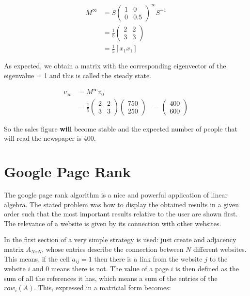 \documentclass{article}
\begin{document}
\begin{equation}
\begin{aligned}
M^\infty &= 
	S 
	\begin{pmatrix}
	1 & 0 \\ 
	0 & 0.5 
	\end{pmatrix}^\infty
	S^{-1} \\
    &= \frac{1}{5} 
	\begin{pmatrix}
	2 & 2 \\ 
	3 & 3
	\end{pmatrix} \\
	&= \frac{1}{5} [x_1 x_1]
\end{aligned}
\end{equation} 

As expected, we obtain a matrix with the 
corresponding eigenvector of the eigenvalue = 1
and this is called the steady state.

\begin{equation*}
\begin{aligned}
v_\infty &=  M^\infty v_0\\
	     &=  \frac{1}{5} 
	\begin{pmatrix}
	2 & 2 \\ 
	3 & 3
	\end{pmatrix}
	\left(
	\begin{array}{c}
	750 \\ 
	250 
	 \end{array}
	 \right)
	  &=
	  \left(
	  \begin{array}{c}
	  400\\ 
	  600 
	   \end{array}
	   \right) 
\end{aligned}
\end{equation*} 

So the sales figure \textbf{will} become stable and the expected number of people
that will read the newspaper is 400.

\section{Google Page Rank}

The google page rank algorithm is a nice and powerful application of linear algebra. 
The stated problem was how to display the obtained results in a given order such that
the most important results relative to the user are shown first. 
The relevance of a website is given by its connection with other websites. 

In the first section of \cite{prank1} a very simple strategy is used: just create
and adjacency matrix $A_{NxN}$, whose entries describe the connection between $N$
different websites.
This means, if the cell $a_{ij} = 1$ then there is a link from the website $j$ to the
website $i$ and 0 means there is not. The value of a page $i$ is then defined as the sum
of all the references it has, which means a sum of the entries of the $row_i(A)$. This, 
expressed in a matricial form becomes:
\end{document}
